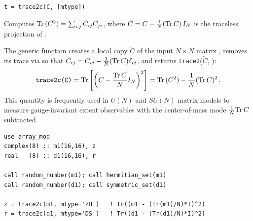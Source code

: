 \lstset{language=[95]Fortran}
\begin{lstlisting}
t = trace2c(C, [mtype])
\end{lstlisting}

Computes ${\rm Tr\,}(\tilde{C}^2) = \sum_{i,j} \tilde{C}_{ij} \tilde{C}_{ji}$, where $\tilde{C} = C - \frac{1}{N}({\rm Tr\,} C)\, I_N$ is the traceless projection of .

The generic function  creates a local copy $\tilde{C}$ of the input $N\times N$ matrix , removes its trace via  so that $\tilde{C}_{ij} = C_{ij} - \frac{1}{N}({\rm Tr\,} C)\delta_{ij}$, and returns \texttt{trace2}($\tilde{C}$, ):
\begin{align}
  \texttt{trace2c(C)} = {\rm Tr\,}\!\left[\left(C - \frac{{\rm Tr\,} C}{N} I_N\right)^2\right] = {\rm Tr\,}(C^2) - \frac{1}{N}({\rm Tr\,} C)^2\, .
\end{align}
This quantity is frequently used in $U(N)$ and $SU(N)$ matrix models to measure gauge-invariant extent observables with the center-of-mass mode $\frac{1}{N}{\rm Tr\,} C$ subtracted.

\begin{description}[leftmargin=2.2cm, style=nextline]
\end{description}

\lstset{language=[95]Fortran}
\begin{lstlisting}
use array_mod
complex(8) :: m1(16,16), z
real   (8) :: d1(16,16), r

call random_number(m1); call hermitian_set(m1)
call random_number(d1); call symmetric_set(d1)

z = trace2c(m1, mtype='ZH')   ! Tr((m1 - (Tr(m1)/N)*I)^2)
r = trace2c(d1, mtype='DS')   ! Tr((d1 - (Tr(d1)/N)*I)^2)
\end{lstlisting}


